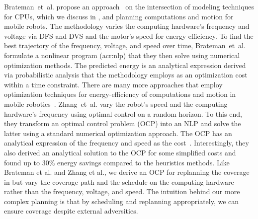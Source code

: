 Brateman~et~al. propose an approach~\citep{brateman2006energy} on the intersection of modeling techniques for CPUs, which we discuss in , and planning computations and motion for mobile robots. The methodology varies the computing hardware's frequency and voltage via DFS and DVS and the motor's speed for energy efficiency. To find the best trajectory of the frequency, voltage, and speed over time, Brateman~et~al. formulate a nonlinear program (\Gls{acr:nlp}) that they then solve using numerical optimization methods. The predicted energy is an analytical expression derived via probabilistic analysis that the methodology employs as an optimization cost within a time constraint. There are many more approaches that employ optimization techniques for energy-efficiency of computations and motion in mobile robotics~\citep{zhang2007low,ondruska2015scheduled,lahijanian2018resource}. Zhang~et~al. vary the robot's speed and the computing hardware's frequency using optimal control on a random horizon. To this end, they transform an optimal control problem (OCP) into an NLP and solve the latter using a standard numerical optimization approach. The OCP has an analytical expression of the frequency and speed as the cost~\citep{zhang2007low}. Interestingly, they also derived an analytical solution to the OCP for some simplified costs and found up to 30\% energy savings compared to the heuristics methods. Like Brateman et al. and Zhang et al., we derive an OCP for replanning the coverage in  but vary the coverage path and the schedule on the computing hardware rather than the frequency, voltage, and speed. The intuition behind our more complex planning is that by scheduling and replanning appropriately, we can ensure coverage despite external adversities.

